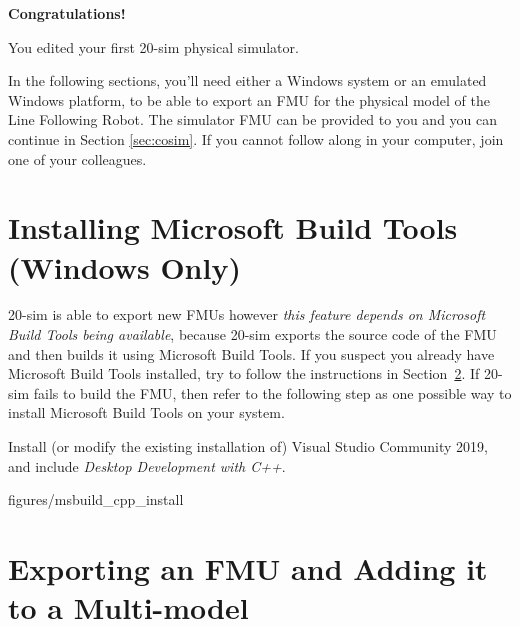\documentclass[11pt,a4paper]{../tutorial}
\begin{document}
\bigskip
\bigskip
{\large\bfseries Congratulations!}

You edited your first 20-sim physical simulator.

In the following sections, you'll need either a Windows system or an emulated Windows platform, to be
able to export an FMU for the physical model of the Line Following Robot. The
simulator FMU can be provided to you and you can continue in Section
\ref{sec:cosim}. If you cannot follow along in your computer, join one of your colleagues.

\newpage

\section{Installing Microsoft Build Tools (Windows Only)} 
\label{sec:install_msbuild}

20-sim is able to export new FMUs however \emph{this feature depends on Microsoft Build Tools being available}, because 20-sim exports the source code of the FMU and then builds it using Microsoft Build Tools.
If you suspect you already have Microsoft Build Tools installed, try to follow the instructions in Section~\ref{sec:export_fmu}.
If 20-sim fails to build the FMU, then refer to the following step as one possible way to install Microsoft Build Tools on your system.

\begin{instructions}

\item Install (or modify the existing installation of) Visual Studio Community 2019, and include \emph{Desktop Development with C++}.

    \begin{annotation}[width=0.8\linewidth,trim=0 0cm 0 0,clip ]{figures/msbuild_cpp_install}
    \end{annotation}


\end{instructions}

\newpage

\section{Exporting an FMU and Adding it to a Multi-model}
\label{sec:export_fmu}
\end{document}
